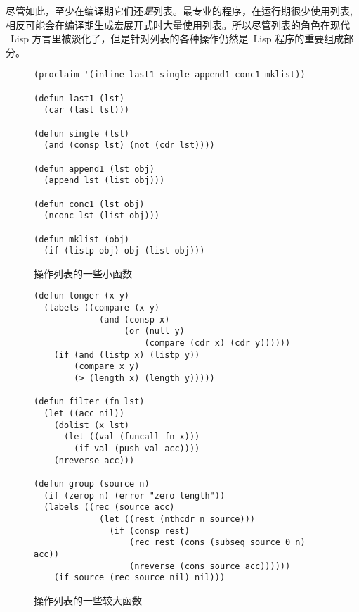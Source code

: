 尽管如此，至少在编译期它们还\emph{是}列表。最专业的程序，在运行期很少使用列表,
相反可能会在编译期生成宏展开式时大量使用列表。所以尽管列表的角色在现代
~Lisp 方言里被淡化了，但是针对列表的各种操作仍然是~Lisp 程序的重要组成部分。

\begin{figure}
\begin{lstlisting}
(proclaim '(inline last1 single append1 conc1 mklist))

(defun last1 (lst)
  (car (last lst)))

(defun single (lst)
  (and (consp lst) (not (cdr lst))))

(defun append1 (lst obj)
  (append lst (list obj)))

(defun conc1 (lst obj)
  (nconc lst (list obj)))

(defun mklist (obj)
  (if (listp obj) obj (list obj)))
\end{lstlisting}
\caption{\label{fig:small_functions_which_operate_on_lists}
  操作列表的一些小函数}
\end{figure}

\begin{figure}
\begin{lstlisting}
(defun longer (x y)
  (labels ((compare (x y)
             (and (consp x)
                  (or (null y)
                      (compare (cdr x) (cdr y))))))
    (if (and (listp x) (listp y))
        (compare x y)
        (> (length x) (length y)))))

(defun filter (fn lst)
  (let ((acc nil))
    (dolist (x lst)
      (let ((val (funcall fn x)))
        (if val (push val acc))))
    (nreverse acc)))

(defun group (source n)
  (if (zerop n) (error "zero length"))
  (labels ((rec (source acc)
             (let ((rest (nthcdr n source)))
               (if (consp rest)
                   (rec rest (cons (subseq source 0 n) acc))
                   (nreverse (cons source acc))))))
    (if source (rec source nil) nil)))
\end{lstlisting}
\caption{操作列表的一些较大函数}
\label{fig:larger_functions_that_operate_on_lists}
\label{fun:group}
\end{figure}

